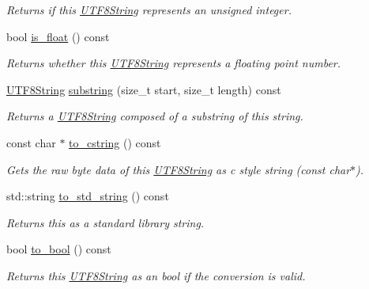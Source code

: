 \begin{DoxyCompactItemize}
\begin{DoxyCompactList}\small\item\em Returns if this \hyperlink{classchaos_1_1str_1_1_u_t_f8_string}{U\+T\+F8\+String} represents an unsigned integer. \end{DoxyCompactList}\item 
\hypertarget{classchaos_1_1str_1_1_u_t_f8_string_a2fbd69fb90a390df37c119577d4d3c6a}{}bool \hyperlink{classchaos_1_1str_1_1_u_t_f8_string_a2fbd69fb90a390df37c119577d4d3c6a}{is\+\_\+float} () const \label{classchaos_1_1str_1_1_u_t_f8_string_a2fbd69fb90a390df37c119577d4d3c6a}

\begin{DoxyCompactList}\small\item\em Returns whether this \hyperlink{classchaos_1_1str_1_1_u_t_f8_string}{U\+T\+F8\+String} represents a floating point number. \end{DoxyCompactList}\item 
\hyperlink{classchaos_1_1str_1_1_u_t_f8_string}{U\+T\+F8\+String} \hyperlink{classchaos_1_1str_1_1_u_t_f8_string_a2d50ab58715264ae175f521816bf670c}{substring} (size\+\_\+t start, size\+\_\+t length) const 
\begin{DoxyCompactList}\small\item\em Returns a \hyperlink{classchaos_1_1str_1_1_u_t_f8_string}{U\+T\+F8\+String} composed of a substring of this string. \end{DoxyCompactList}\item 
const char $\ast$ \hyperlink{classchaos_1_1str_1_1_u_t_f8_string_aa6fd66af34d7a3c4a495860952e97557}{to\+\_\+cstring} () const 
\begin{DoxyCompactList}\small\item\em Gets the raw byte data of this \hyperlink{classchaos_1_1str_1_1_u_t_f8_string}{U\+T\+F8\+String} as c style string (const char$\ast$). \end{DoxyCompactList}\item 
std\+::string \hyperlink{classchaos_1_1str_1_1_u_t_f8_string_a8901fbbe5e72d7bf8f0d160b55475244}{to\+\_\+std\+\_\+string} () const 
\begin{DoxyCompactList}\small\item\em Returns this as a standard library string. \end{DoxyCompactList}\item 
bool \hyperlink{classchaos_1_1str_1_1_u_t_f8_string_abea65bae8fc882d3bacb91aa2befe0b1}{to\+\_\+bool} () const 
\begin{DoxyCompactList}\small\item\em Returns this \hyperlink{classchaos_1_1str_1_1_u_t_f8_string}{U\+T\+F8\+String} as an bool if the conversion is valid. \end{DoxyCompactList}\item 

\end{DoxyCompactItemize}
